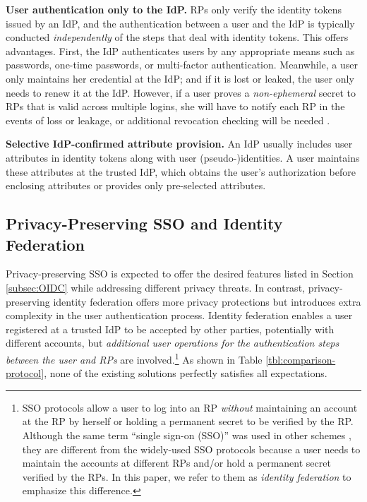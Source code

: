 \noindent\textbf{User authentication only to the IdP.}
RPs only verify the identity tokens issued by an IdP, and the authentication between a user and the IdP is typically conducted \emph{independently} of the steps that deal with identity tokens.
This offers advantages. First, the IdP authenticates users by any appropriate means such as passwords, one-time passwords, or multi-factor authentication.
Meanwhile, a user only maintains her credential at the IdP; and if it is lost or leaked, the user only needs to renew it at the IdP.
However, if a user proves a \emph{non-ephemeral} secret to RPs that is valid across multiple logins, she will have to notify each RP in the events of loss or leakage, or additional revocation checking will be needed \cite{ELPASSO, UnlimitID}.

\noindent\textbf{Selective IdP-confirmed attribute provision.}
An IdP usually includes user attributes in identity tokens \cite{OpenIDConnect,rfc6749} along with user (pseudo-)identities.
A user maintains these attributes at the trusted IdP,
which obtains the user's authorization before enclosing attributes or provides only pre-selected attributes.

\subsection{Privacy-Preserving SSO and Identity Federation}
\label{subsec-solutions}

Privacy-preserving SSO is expected to offer the desired features listed in Section \ref{subsec:OIDC} while addressing different privacy threats.
In contrast, privacy-preserving identity federation offers more privacy protections but introduces extra complexity in the user authentication process.
Identity federation enables a user registered at a trusted IdP to be accepted by other parties, potentially with different accounts,
but \emph{additional user operations for the authentication steps between the user and RPs} are involved.\footnote{SSO protocols \cite{OpenIDConnect,rfc6749, SAML, SAMLIdentifier} allow a user to log into an RP \emph{without} maintaining an account at the RP by herself or holding a permanent secret to be verified by the RP. Although the same term ``single sign-on (SSO)'' was used in other schemes \cite{PseudoID, Opaak, ELPASSO, WangWS13, HanCSTW18, HanCSTWW20}, they are different from the widely-used SSO protocols because a user needs to maintain the accounts at different RPs and/or hold a permanent secret verified by the RPs. In this paper, we refer to them as \emph{identity federation} to emphasize this difference.}
As shown in Table \ref{tbl:comparison-protocol}, none of the existing solutions 
perfectly satisfies all expectations.


